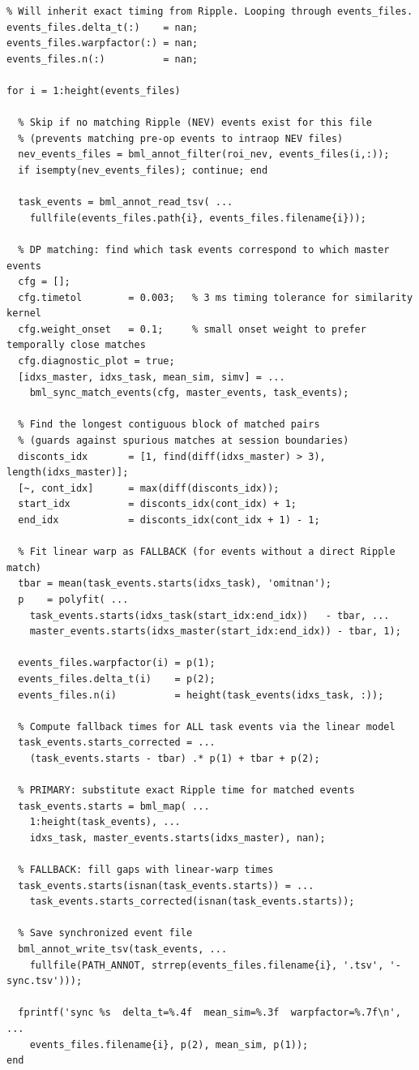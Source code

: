 \documentclass[11pt, a4paper]{article}
\begin{document}
\begin{lstlisting}[style=matlab, caption={Fallback strategy: exact Ripple times where available, linear interpolation elsewhere}]
% SYNCHRONIZING EVENT FILES TO RIPPLE EVENTS
% Will inherit exact timing from Ripple. Looping through events_files.
events_files.delta_t(:)    = nan;
events_files.warpfactor(:) = nan;
events_files.n(:)          = nan;

for i = 1:height(events_files)

  % Skip if no matching Ripple (NEV) events exist for this file
  % (prevents matching pre-op events to intraop NEV files)
  nev_events_files = bml_annot_filter(roi_nev, events_files(i,:));
  if isempty(nev_events_files); continue; end

  task_events = bml_annot_read_tsv( ...
    fullfile(events_files.path{i}, events_files.filename{i}));

  % DP matching: find which task events correspond to which master events
  cfg = [];
  cfg.timetol        = 0.003;   % 3 ms timing tolerance for similarity kernel
  cfg.weight_onset   = 0.1;     % small onset weight to prefer temporally close matches
  cfg.diagnostic_plot = true;
  [idxs_master, idxs_task, mean_sim, simv] = ...
    bml_sync_match_events(cfg, master_events, task_events);

  % Find the longest contiguous block of matched pairs
  % (guards against spurious matches at session boundaries)
  disconts_idx       = [1, find(diff(idxs_master) > 3), length(idxs_master)];
  [~, cont_idx]      = max(diff(disconts_idx));
  start_idx          = disconts_idx(cont_idx) + 1;
  end_idx            = disconts_idx(cont_idx + 1) - 1;

  % Fit linear warp as FALLBACK (for events without a direct Ripple match)
  tbar = mean(task_events.starts(idxs_task), 'omitnan');
  p    = polyfit( ...
    task_events.starts(idxs_task(start_idx:end_idx))   - tbar, ...
    master_events.starts(idxs_master(start_idx:end_idx)) - tbar, 1);

  events_files.warpfactor(i) = p(1);
  events_files.delta_t(i)    = p(2);
  events_files.n(i)          = height(task_events(idxs_task, :));

  % Compute fallback times for ALL task events via the linear model
  task_events.starts_corrected = ...
    (task_events.starts - tbar) .* p(1) + tbar + p(2);

  % PRIMARY: substitute exact Ripple time for matched events
  task_events.starts = bml_map( ...
    1:height(task_events), ...
    idxs_task, master_events.starts(idxs_master), nan);

  % FALLBACK: fill gaps with linear-warp times
  task_events.starts(isnan(task_events.starts)) = ...
    task_events.starts_corrected(isnan(task_events.starts));

  % Save synchronized event file
  bml_annot_write_tsv(task_events, ...
    fullfile(PATH_ANNOT, strrep(events_files.filename{i}, '.tsv', '-sync.tsv')));

  fprintf('sync %s  delta_t=%.4f  mean_sim=%.3f  warpfactor=%.7f\n', ...
    events_files.filename{i}, p(2), mean_sim, p(1));
end
\end{lstlisting}
\end{document}
